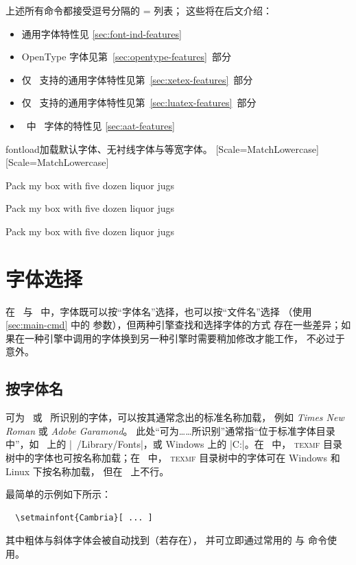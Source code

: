 \documentclass[a4paper]{l3doc}
\begin{document}
上述所有命令都接受逗号分隔的 = 列表；
这些将在后文介绍：
\begin{itemize}
\item 通用字体特性见 \vref{sec:font-ind-features}
\item OpenType 字体见第~\vref{sec:opentype-features}~部分
\item 仅 \XeTeX\ 支持的通用字体特性见第~\vref{sec:xetex-features}~部分
\item 仅 \LuaTeX\ 支持的通用字体特性见第~\vref{sec:luatex-features}~部分
\item \XeTeX\ 中 \AAT\ 字体的特性见 \vref{sec:aat-features}
\end{itemize}

\begin{Lexample}{fontload}{加载默认字体、无衬线字体与等宽字体。}
  \setmainfont{texgyrebonum-regular.otf}
  \setsansfont{lmsans10-regular.otf}[Scale=MatchLowercase]
  \setmonofont{Inconsolatazi4-Regular.otf}[Scale=MatchLowercase]

  \rmfamily Pack my box with five dozen liquor jugs\par
  \sffamily Pack my box with five dozen liquor jugs\par
  \ttfamily Pack my box with five dozen liquor jugs
\end{Lexample}

\section{字体选择}

在 \LuaTeX\ 与 \XeTeX\ 中，字体既可以按“字体名”选择，也可以按“文件名”选择
（使用 \ref{sec:main-cmd} 中的  参数），但两种引擎查找和选择字体的方式
存在一些差异；如果在一种引擎中调用的字体换到另一种引擎时需要稍加修改才能工作，
不必过于意外。


\subsection{按字体名}

可为 \LuaTeX\ 或 \XeTeX\ 所识别的字体，可以按其通常念出的标准名称加载，
例如 \emph{Times New Roman} 或 \emph{Adobe Garamond}。
此处“可为……所识别”通常指“位于标准字体目录中”，如 \MacOSX\ 上的
|~/Library/Fonts|，或 Windows 上的 |C:\Windows\Fonts|。在 \LuaTeX\ 中，
\textsc{texmf} 目录树中的字体也可按名称加载；在 \XeTeX\ 中，
\textsc{texmf} 目录树中的字体可在 Windows 和 Linux 下按名称加载，
但在 \MacOSX\ 上不行。

最简单的示例如下所示：
\begin{Verbatim}
  \setmainfont{Cambria}[ ... ]
\end{Verbatim}
其中粗体与斜体字体会被自动找到（若存在），
并可立即通过常用的  与  命令使用。
\end{document}
